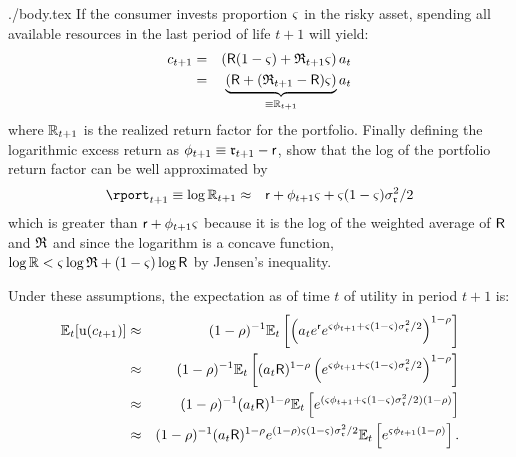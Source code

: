 \documentclass{bejournal}
\begin{document}
\begin{verbatimwrite}{./body.tex}
If the consumer invests proportion ${\varsigma}$ in the risky asset, 
spending all available resources in the last period of life $t+1$ will yield:
\begin{eqnarray*}
        c_{t+1} & = & \left(\mathsf{R}(1-{\varsigma})+\mathfrak{R}_{t+1}{\varsigma}\right)a_{t}
\\ & = & \underbrace{\left(\mathsf{R}+(\mathfrak{R}_{t+1}-\mathsf{R}){\varsigma}\right)}_{\equiv \mathbb{R}_{t+1}}a_{t}
\end{eqnarray*}
where $\mathbb{R}_{t+1}$ is the realized return factor for the portfolio.
Finally defining the logarithmic excess return as $\phi_{t+1}\equiv
\mathfrak{r}_{t+1}-\mathsf{r}$, \cite{cvAppendix} show that the log of the
portfolio return factor can be well approximated by
\begin{eqnarray}
 \rport_{t+1} \equiv \log \Rport_{t+1} & \approx & \rfree + \eprem_{t+1} \riskyshare + \riskyshare(1-\riskyshare)\sigma^{2}_{\risky}/2 \label{eq:CampVic}
\end{eqnarray}
which is greater than $\mathsf{r} + \phi_{t+1} {\varsigma}$ because it is the log of the weighted average of $\mathsf{R}$ and $\mathfrak{R}$ and since the logarithm is a concave function, $\log \mathbb{R} < {\varsigma} \log \mathfrak{R} + (1-{\varsigma}) \log \mathsf{R}$ by Jensen's inequality.

Under these assumptions, the expectation as of time $t$ of utility in period $t+1$
is:
\begin{eqnarray}
  \mathbb{E}_{t}[{\mathrm{u}}(c_{t+1})] & \approx & (1-\rho)^{-1}\mathbb{E}_{t}\left[\left(a_{t}e^{\mathsf{r}}e^{{\varsigma} \phi_{t+1}+{\varsigma}(1-{\varsigma})\sigma^{2}_{\mathfrak{r}}/2 }\right)^{1-\rho}\right] \notag
\\                      & \approx & (1-\rho)^{-1}\mathbb{E}_{t}\left[(a_{t}\mathsf{R})^{1-\rho}\left( e^{{\varsigma} \phi_{t+1}+{\varsigma}(1-{\varsigma})\sigma^{2}_{\mathfrak{r}}/2 }\right)^{1-\rho}\right] \notag
\\                      & \approx & (1-\rho)^{-1}(a_{t}\mathsf{R})^{1-\rho}\mathbb{E}_{t}\left[e^{({\varsigma} \phi_{t+1}+{\varsigma}(1-{\varsigma})\sigma^{2}_{\mathfrak{r}}/2)  (1-\rho)}\right] \notag
\\                      & \approx & (1-\rho)^{-1}(a_{t}\mathsf{R})^{1-\rho}e^{ (1-\rho){\varsigma}(1-{\varsigma})\sigma^{2}_{\mathfrak{r}}/2}\mathbb{E}_{t}\left[e^{{\varsigma} \phi_{t+1}  (1-\rho)}\right]
. \label{eq:exputil}
  \end{eqnarray}


\end{verbatimwrite}
\end{document}
